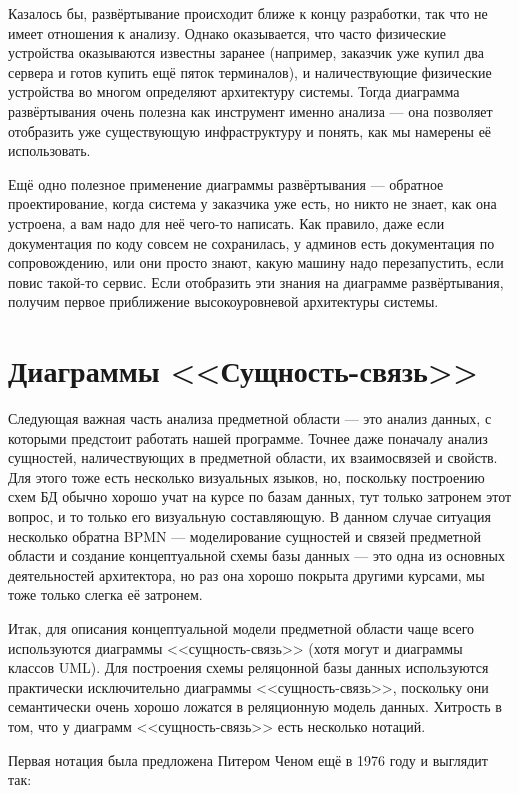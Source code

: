 \documentclass[a5paper]{article}
\begin{document}
Казалось бы, развёртывание происходит ближе к концу разработки, так что не имеет отношения к анализу. Однако оказывается, что часто физические устройства оказываются известны заранее (например, заказчик уже купил два сервера и готов купить ещё пяток терминалов), и наличествующие физические устройства во многом определяют архитектуру системы. Тогда диаграмма развёртывания очень полезна как инструмент именно анализа --- она позволяет отобразить уже существующую инфраструктуру и понять, как мы намерены её использовать.

Ещё одно полезное применение диаграммы развёртывания --- обратное проектирование, когда система у заказчика уже есть, но никто не знает, как она устроена, а вам надо для неё чего-то написать. Как правило, даже если документация по коду совсем не сохранилась, у админов есть документация по сопровождению, или они просто знают, какую машину надо перезапустить, если повис такой-то сервис. Если отобразить эти знания на диаграмме развёртывания, получим первое приближение высокоуровневой архитектуры системы.

\section{Диаграммы <<Сущность-связь>>}

Следующая важная часть анализа предметной области --- это анализ данных, с которыми предстоит работать нашей программе. Точнее даже поначалу анализ сущностей, наличествующих в предметной области, их взаимосвязей и свойств. Для этого тоже есть несколько визуальных языков, но, поскольку построению схем БД обычно хорошо учат на курсе по базам данных, тут только затронем этот вопрос, и то только его визуальную составляющую. В данном случае ситуация несколько обратна BPMN --- моделирование сущностей и связей предметной области и создание концептуальной схемы базы данных --- это одна из основных деятельностей архитектора, но раз она хорошо покрыта другими курсами, мы тоже только слегка её затронем.

Итак, для описания концептуальной модели предметной области чаще всего используются диаграммы <<сущность-связь>> (хотя могут и диаграммы классов UML). Для построения схемы реляцонной базы данных используются практически исключительно диаграммы <<сущность-связь>>, поскольку они семантически очень хорошо ложатся в реляционную модель данных. Хитрость в том, что у диаграмм <<сущность-связь>> есть несколько нотаций.

Первая нотация была предложена Питером Ченом ещё в 1976 году и выглядит так:
\end{document}
